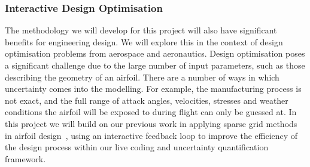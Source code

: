 \subsubsection*{Interactive Design Optimisation}

The methodology we will develop for this project will also have
significant benefits for engineering design. We will explore this in
the context of design optimisation problems from aerospace and
aeronautics. Design optimisation poses a significant challenge due to
the large number of input parameters, such as those describing the
geometry of an airfoil. There are a number of ways in which
uncertainty comes into the modelling. For example, the manufacturing
process is not exact, and the full range of attack angles, velocities,
stresses and weather conditions the airfoil will be exposed to during
flight can only be guessed at. In this project we will build on our
previous work in applying sparse grid methods in airfoil
design~\parencite{SU2,deBaarHarding2015}, using an interactive
feedback loop to improve the efficiency of the design process within
our live coding and uncertainty quantification framework.



